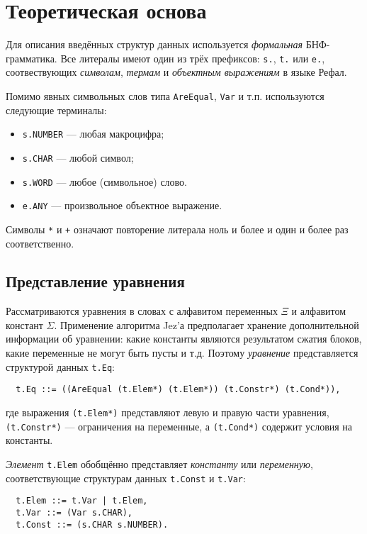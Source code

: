 \documentclass[12pt]{article}
\begin{document}
\section{Теоретическая основа}

Для описания введённых структур данных используется \textit{формальная}
БНФ-грамматика. Все литералы имеют один из трёх префиксов: \texttt{s.},
\texttt{t.} или \texttt{e.}, соотвествующих \textit{символам}, \textit{термам} и
\textit{объектным выражениям} в языке Рефал.

Помимо явных символьных слов типа \texttt{AreEqual}, \texttt{Var} и т.п.
используются следующие терминалы:
\begin{itemize}
  \item \texttt{s.NUMBER} --- любая макроцифра; 
  \item \texttt{s.CHAR} --- любой символ; 
  \item \texttt{s.WORD} --- любое (символьное) слово.
  \item \texttt{e.ANY} --- произвольное объектное выражение.
\end{itemize}

Символы \texttt{*} и \texttt{+} означают повторение литерала ноль и более и
один и более раз соответственно.

\subsection{Представление уравнения}

Рассматриваются уравнения в словах с алфавитом переменных $\Xi$ и алфавитом
констант $\Sigma$. Применение алгоритма Jez'а предполагает хранение
дополнительной информации об уравнении: какие константы являются результатом
сжатия блоков, какие переменные не могут быть пусты и т.д. Поэтому
\textit{уравнение} представляется структурой данных \texttt{t.Eq}:
\begin{Verbatim}
  t.Eq ::= ((AreEqual (t.Elem*) (t.Elem*)) (t.Constr*) (t.Cond*)),
\end{Verbatim}
где выражения \texttt{(t.Elem*)} представляют левую и правую части уравнения,
\texttt{(t.Constr*)} --- ограничения на переменные, а \texttt{(t.Cond*)}
содержит условия на константы.

\textit{Элемент} \texttt{t.Elem} обобщённо представляет \textit{константу} или
\textit{переменную}, соответствующие структурам данных \texttt{t.Const} и
\texttt{t.Var}:
\begin{Verbatim}
  t.Elem ::= t.Var | t.Elem,
  t.Var ::= (Var s.CHAR),
  t.Const ::= (s.CHAR s.NUMBER).
\end{Verbatim}
\end{document}
